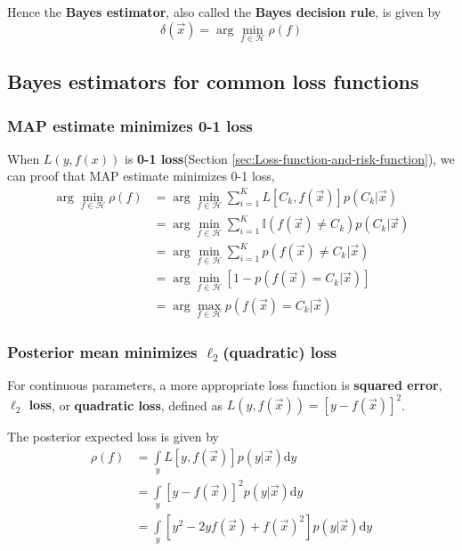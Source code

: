 Hence the \textbf{Bayes estimator}, also called the \textbf{Bayes decision rule}, is given by
\begin{equation}
\delta(\vec{x})=\arg\min\limits_{f \in \mathcal{H}} \rho(f)
\end{equation}


\subsection{Bayes estimators for common loss functions}


\subsubsection{MAP estimate minimizes 0-1 loss}
When $L(y,f(x))$ is \textbf{0-1 loss}(Section \ref{sec:Loss-function-and-risk-function}), we can proof that MAP estimate minimizes 0-1 loss, 
\begin{align*}
\arg\min\limits_{f \in \mathcal{H}} \rho(f)& =\arg\min\limits_{f \in \mathcal{H}} \sum\limits_{i=1}^K{L[C_k,f(\vec{x})]p(C_k|\vec{x})} \\
         & =\arg\min\limits_{f \in \mathcal{H}} \sum\limits_{i=1}^K{\mathbb{I}(f(\vec{x}) \neq C_k)p(C_k|\vec{x})} \\
		 & =\arg\min\limits_{f \in \mathcal{H}} \sum\limits_{i=1}^K{p(f(\vec{x}) \neq C_k|\vec{x})} \\
		 & =\arg\min\limits_{f \in \mathcal{H}} \left[1-{p(f(\vec{x}) = C_k|\vec{x})}\right] \\
		 & =\arg\max\limits_{f \in \mathcal{H}} p(f(\vec{x}) = C_k|\vec{x})
\end{align*}


\subsubsection{Posterior mean minimizes	$\ell_2$(quadratic) loss}
For continuous parameters, a more appropriate loss function is \textbf{squared error}, \textbf{$\ell_2$ loss}, or \textbf{quadratic loss}, defined as $L(y,f(\vec{x}))=\left[y-f(\vec{x})\right]^2$.

The posterior expected loss is given by
\begin{equation}\begin{split}
\rho(f) & =\int\limits_y L[y,f(\vec{x})]p(y|\vec{x})\mathrm{d}y \\
        & =\int\limits_y \left[y-f(\vec{x})\right]^2p(y|\vec{x})\mathrm{d}y \\
        & =\int\limits_y \left[y^2-2yf(\vec{x})+f(\vec{x})^2\right]p(y|\vec{x})\mathrm{d}y
\end{split}\end{equation}

